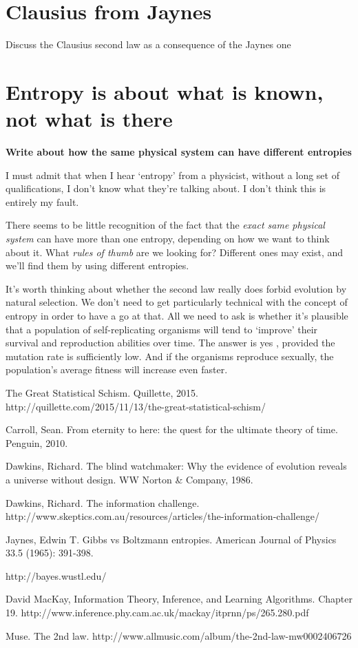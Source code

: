 \documentclass[a4paper, 12pt]{article}
\begin{document}
\section*{Clausius from Jaynes}
Discuss the Clausius second law as a consequence of the Jaynes one



\section*{Entropy is about what is known, not what is there}
{\bf Write about how the same physical system can have different entropies}


I must admit that when I hear `entropy' from a physicist, without a long
set of qualifications, I don't know what they're talking about.
I don't think this is entirely my fault.

There seems to be little recognition of the fact
that the {\em exact same physical system}
can have more than one entropy, depending on how we want to think about it.
What {\em rules of thumb} are we looking for? Different ones may exist, and
we'll find them by using different entropies.


It's worth thinking about whether the second law really does forbid evolution
by natural selection. We don't need to get particularly technical with the
concept of entropy in order to have a go at that. All we need to ask is whether
it's plausible that a population of self-replicating organisms will tend to
`improve' their survival and reproduction abilities over time.
The answer is yes \citep{mackay}, provided the mutation rate is sufficiently
low. And if the organisms reproduce sexually, the population's average fitness
will increase even faster.


\begin{thebibliography}{999} %
 The Great Statistical Schism. Quillette, 2015.
http://quillette.com/2015/11/13/the-great-statistical-schism/

Carroll, Sean. From eternity to here: the quest for the ultimate theory of time. Penguin, 2010.

Dawkins, Richard. The blind watchmaker: Why the evidence of evolution reveals a universe without design. WW Norton \& Company, 1986.

Dawkins, Richard. The information challenge.
http://www.skeptics.com.au/resources/articles/the-information-challenge/

Jaynes, Edwin T.
Gibbs vs Boltzmann entropies. American Journal of Physics 33.5 (1965): 391-398.

http://bayes.wustl.edu/

David MacKay, Information Theory, Inference, and Learning Algorithms.
Chapter 19.
http://www.inference.phy.cam.ac.uk/mackay/itprnn/ps/265.280.pdf

Muse. The 2nd law.
http://www.allmusic.com/album/the-2nd-law-mw0002406726
\end{thebibliography}
\end{document}
